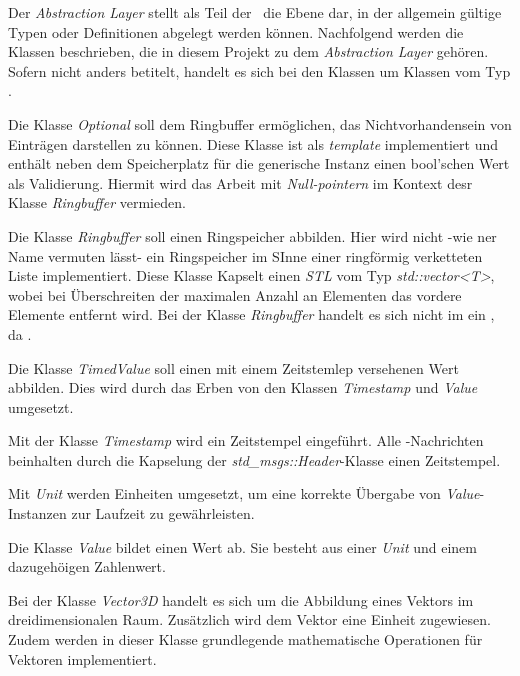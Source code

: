 
Der \textit{Abstraction Layer} stellt als Teil der \clean\ die Ebene dar, in der allgemein gültige Typen oder Definitionen abgelegt werden können. Nachfolgend werden die Klassen beschrieben, die in diesem Projekt zu dem \textit{Abstraction Layer} gehören. Sofern nicht anders betitelt, handelt es sich bei den Klassen um Klassen vom Typ \VO.



Die Klasse \textit{Optional} soll dem Ringbuffer ermöglichen, das Nichtvorhandensein von Einträgen darstellen zu können. Diese Klasse ist als \textit{template} implementiert und enthält neben dem Speicherplatz für die generische Instanz einen bool'schen Wert als Validierung.
Hiermit wird das Arbeit mit \textit{Null-pointern} im Kontext desr Klasse \textit{Ringbuffer} vermieden.


Die Klasse \textit{Ringbuffer} soll einen Ringspeicher abbilden. Hier wird nicht -wie ner Name vermuten lässt- ein Ringspeicher im SInne einer ringförmig verketteten Liste implementiert. Diese Klasse Kapselt einen \textit{STL} vom Typ \textit{std::vector<T>}, wobei bei Überschreiten der maximalen Anzahl an Elementen das vordere Elemente entfernt wird.
Bei der Klasse \textit{Ringbuffer} handelt es sich nicht im ein \VO, da .


Die Klasse \textit{TimedValue} soll einen mit einem Zeitstemlep versehenen Wert abbilden. Dies wird durch das Erben von den Klassen \textit{Timestamp} und \textit{Value} umgesetzt.



Mit der Klasse \textit{Timestamp} wird ein Zeitstempel eingeführt. Alle \ROS-Nachrichten beinhalten durch die Kapselung der \textit{std\_msgs::Header}-Klasse einen Zeitstempel.


Mit \textit{Unit} werden Einheiten umgesetzt, um eine korrekte Übergabe von \textit{Value}-Instanzen zur Laufzeit zu gewährleisten.


Die Klasse \textit{Value} bildet einen Wert ab. Sie besteht aus einer \textit{Unit} und einem dazugehöigen Zahlenwert.


Bei der Klasse \textit{Vector3D} handelt es sich um die Abbildung eines Vektors im dreidimensionalen Raum. Zusätzlich wird dem Vektor eine Einheit zugewiesen.
Zudem werden in dieser Klasse grundlegende mathematische Operationen für Vektoren implementiert.





